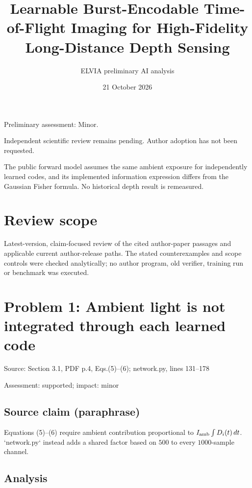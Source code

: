 \documentclass[11pt]{article}
\begin{document}
\title{Learnable Burst-Encodable Time-of-Flight Imaging for High-Fidelity Long-Distance Depth Sensing}

\author{ELVIA preliminary AI analysis}\date{21 October 2026}\maketitle

Preliminary assessment: Minor.\par

Independent scientific review remains pending. Author adoption has not been requested.

The public forward model assumes the same ambient exposure for independently learned codes, and its implemented information expression differs from the Gaussian Fisher formula. No historical depth result is remeasured.

\section*{Review scope}

Latest-version, claim-focused review of the cited author-paper passages and applicable current author-release paths. The stated counterexamples and scope controls were checked analytically; no author program, old verifier, training run or benchmark was executed.

\section*{Problem 1: Ambient light is not integrated through each learned code}

Source: Section 3.1, PDF p.4, Eqs.(5)–(6); network.py, lines 131–178

Assessment: supported; impact: minor

\subsection*{Source claim (paraphrase)}

Equations (5)–(6) require ambient contribution proportional to \(I_{\rm amb}\int D_i(t)\,dt\). `network.py` instead adds a shared factor based on \(500\) to every \(1000\)-sample channel.

\subsection*{Analysis}
\end{document}
